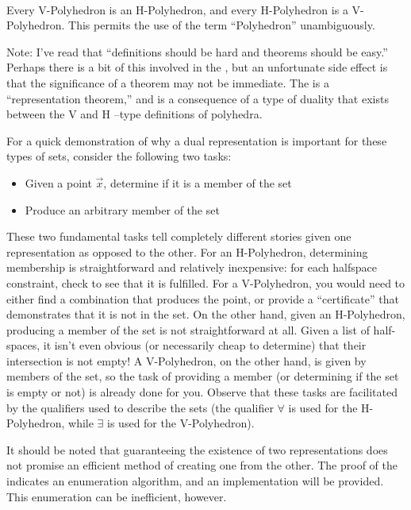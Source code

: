 \paragraph{\MWT}
Every V-Polyhedron is an H-Polyhedron, and every H-Polyhedron is a V-Polyhedron.  This permits the use of the term ``Polyhedron'' unambiguously.
\medskip

Note:  I've read that ``definitions should be hard and theorems should be easy.''  Perhaps there is a bit of this involved in the \MWT{}, but an unfortunate side effect is that the significance of a theorem may not be immediate.  The \MWT{} is a ``representation theorem,'' and is a consequence of a type of duality that exists between the V and H --type definitions of polyhedra.

For a quick demonstration of why a dual representation is important for these types of sets, consider the following two tasks:
\begin{itemize}
  \item Given a point $\vec{x}$, determine if it is a member of the set
  \item Produce an arbitrary member of the set
\end{itemize}
These two fundamental tasks tell completely different stories given one representation as opposed to the other.  For an H-Polyhedron, determining membership is straightforward and relatively inexpensive: for each halfspace constraint, check to see that it is fulfilled.  For a V-Polyhedron, you would need to either find a combination that produces the point, or provide a ``certificate'' that demonstrates that it is not in the set.  On the other hand, given an H-Polyhedron, producing a member of the set is not straightforward at all.  Given a list of half-spaces, it isn't even obvious (or necessarily cheap to determine) that their intersection is not empty!  A V-Polyhedron, on the other hand, is given by members of the set, so the task of providing a member (or determining if the set is empty or not) is already done for you.  Observe that these tasks are facilitated by the qualifiers used to describe the sets (the qualifier $\forall$ is used for the H-Polyhedron, while $\exists$ is used for the V-Polyhedron).

It should be noted that guaranteeing the existence of two representations does not promise an efficient method of creating one from the other.  The proof of the \MWT{} indicates an enumeration algorithm, and an implementation will be provided.  This enumeration can be inefficient, however.

